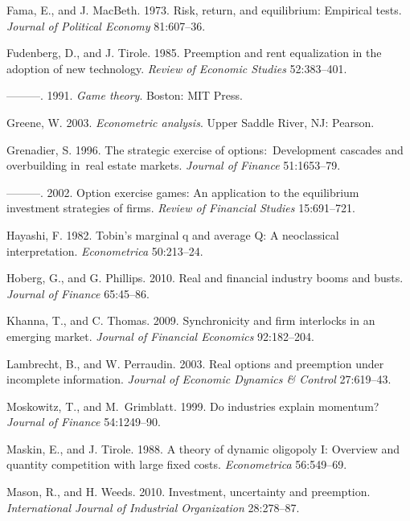 \documentclass[nogrid,nosurname,sort&compress]{RFS}
\begin{document}
\begin{thebibliography}{}
 Fama, E., and J. MacBeth. 1973.
Risk, return, and equilibrium: Empirical tests. \textit{Journal of Political Economy} 81:607--36.

 Fudenberg, D., and J.
Tirole. 1985. Preemption and rent equalization in the adoption of new technology. \textit{Review
of Economic Studies} 52:383--401.

---------. 1991. \textit{Game theory}. Boston: MIT Press.

 Greene, W. 2003. \textit{Econometric analysis}. Upper Saddle River, NJ: Pearson.

 Grenadier, S. 1996. The strategic
exercise of options:\ Development cascades and overbuilding in\ real estate markets.
\textit{Journal of Finance} 51:1653--79.

 ---------. 2002. Option exercise games:
An application to the equilibrium investment strategies of firms. \textit{Review of Financial
Studies} 15:691--721.

 Hayashi, F. 1982. Tobin's marginal q and
average Q: A neoclassical interpretation. \textit{Econometrica} 50:213--24.

 Hoberg, G., and G. Phillips.
2010. Real and financial industry booms and busts. \textit{Journal of Finance} 65:45--86.

 Khanna, T., and C. Thomas. 2009.
Synchronicity and firm interlocks in an emerging market. \textit{Journal of
Financial Economics} 92:182--204.

 Lambrecht, B., and W.
Perraudin. 2003. Real options and preemption under incomplete information. \textit{Journal of
Economic Dynamics \& Control} 27:619--43.

 Moskowitz, T., and M.\
Grimblatt. 1999. Do industries explain momentum? \textit{Journal of Finance }%
54:1249--90.

 Maskin, E., and J. Tirole. 1988.
A theory of dynamic oligopoly I: Overview and quantity competition with large fixed costs.
\textit{Econometrica} 56:549--69.

 Mason, R., and H. Weeds. 2010.
Investment, uncertainty and preemption. \textit{International Journal of Industrial Organization}
28:278--87.


\end{thebibliography}
\end{document}

